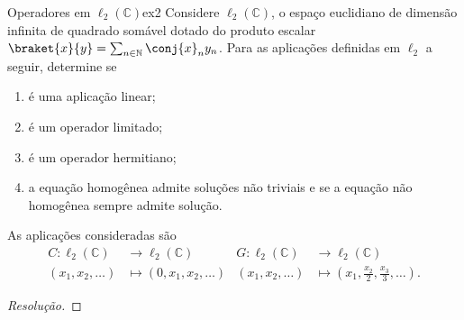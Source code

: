 \begin{exercício}{Operadores em \(\ell_2(\mathbb{C})\)}{ex2}
   Considere \(\ell_2(\mathbb{C})\), o espaço euclidiano  de dimensão infinita de quadrado somável dotado do produto escalar \(\braket{x}{y} = \sum_{n \in \mathbb{N}} \conj{x}_n y_n\). Para as aplicações definidas em \(\ell_2\) a seguir, determine se
   \begin{enumerate}[label=(\alph*)]
       \item é uma aplicação linear;
       \item é um operador limitado;
       \item é um operador hermitiano;
       \item a equação homogênea admite soluções não triviais e se a equação não homogênea sempre admite solução.
   \end{enumerate}
   As aplicações consideradas são
   \begin{align*}
      C : \ell_2(\mathbb{C}) &\to \ell_2(\mathbb{C})&
      G : \ell_2(\mathbb{C}) &\to \ell_2(\mathbb{C})\\
      (x_1, x_2, \dots) &\mapsto (0, x_1, x_2, \dots)&
      (x_1, x_2, \dots) &\mapsto \left(x_1, \frac{x_2}{2}, \frac{x_3}{3}, \dots\right).
   \end{align*}
\end{exercício}
\begin{proof}[Resolução]
    
\end{proof}

